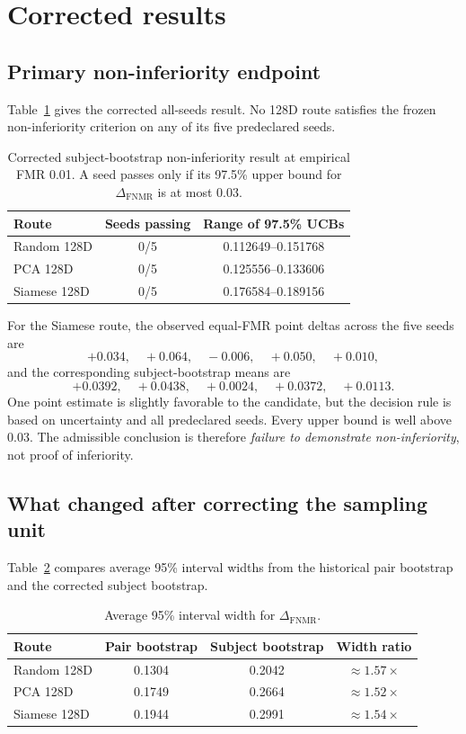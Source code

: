 \documentclass[10pt,a4paper]{article}
\newcommand{\fnmr}{\mathrm{FNMR}}
\newcommand{\DeltaFNMR}{\Delta_{\fnmr}}
\begin{document}
\section{Corrected results}\label{sec:results}

\subsection{Primary non-inferiority endpoint}

Table~\ref{tab:ni} gives the corrected all-seeds result. No 128D route satisfies the frozen
non-inferiority criterion on any of its five predeclared seeds.

\begin{table}[ht]
\centering
\caption{Corrected subject-bootstrap non-inferiority result at empirical FMR 0.01. A seed
passes only if its 97.5\% upper bound for $\DeltaFNMR$ is at most 0.03.}
\label{tab:ni}
\begin{tabular}{@{}lcc@{}}
\toprule
Route & Seeds passing & Range of 97.5\% UCBs\\
\midrule
Random 128D & 0/5 & 0.112649--0.151768\\
PCA 128D & 0/5 & 0.125556--0.133606\\
Siamese 128D & 0/5 & 0.176584--0.189156\\
\bottomrule
\end{tabular}
\end{table}

For the Siamese route, the observed equal-FMR point deltas across the five seeds are
\[
+0.034,\quad +0.064,\quad -0.006,\quad +0.050,\quad +0.010,
\]
and the corresponding subject-bootstrap means are
\[
+0.0392,\quad +0.0438,\quad +0.0024,\quad +0.0372,\quad +0.0113.
\]
One point estimate is slightly favorable to the candidate, but the decision rule is based on
uncertainty and all predeclared seeds. Every upper bound is well above 0.03. The admissible
conclusion is therefore \emph{failure to demonstrate non-inferiority}, not proof of
inferiority.

\subsection{What changed after correcting the sampling unit}

Table~\ref{tab:widths} compares average 95\% interval widths from the historical pair
bootstrap and the corrected subject bootstrap.

\begin{table}[ht]
\centering
\caption{Average 95\% interval width for $\DeltaFNMR$.}
\label{tab:widths}
\begin{tabular}{@{}lccc@{}}
\toprule
Route & Pair bootstrap & Subject bootstrap & Width ratio\\
\midrule
Random 128D & 0.1304 & 0.2042 & $\approx1.57\times$\\
PCA 128D & 0.1749 & 0.2664 & $\approx1.52\times$\\
Siamese 128D & 0.1944 & 0.2991 & $\approx1.54\times$\\
\bottomrule
\end{tabular}
\end{table}
\end{document}
